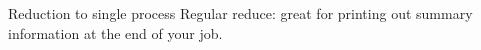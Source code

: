 \begin{comment}
\begin{numberedframe}{Inner product calculation}
  Given vectors $x,y$:
  \[ x^ty = \sum_{i=0}^{N-1} x_iy_i \]
  Start out with distributed vectors~$x,y$,\\
  assume same distribution.

  Proposed solution:\\
  \indexmpishow{MPI_Gather} or \indexmpishow{MPI_Allgather}
  and calculate locally.

  Comments?
\end{numberedframe}

\begin{numberedframe}{Inner product calculation another way}
  What are (at least two) problems with:
\begin{lstlisting}
double local_prod[localsize],global_inprod[localsize];
for (i=0; i<localsize; i++)
    local_prod[i] = x[i]*y[i];
MPI_Allreduce( &local_prod, &global_inprod, 
               localsize,MPI_DOUBLE,MPI_SUM,comm )
\end{lstlisting}
\end{numberedframe}

\begin{numberedframe}{Inner product calculation: the right way}
  Compute local part, then collect local sums.

\lstset{language=C}
\begin{lstlisting}
local_inprod = 0;
for (i=0; i<localsize; i++)
  local_inprod += x[i]*y[i];
MPI_Allreduce( &local_inprod, &global_inprod, 
               1,MPI_DOUBLE,MPI_SUM,comm )
\end{lstlisting}
\end{numberedframe}
\end{comment}

\begin{comment}
  \begin{optexerciseframe}
    
  \end{optexerciseframe}
\end{comment}

\begin{numberedframe}{Reduction to single process}
    Regular reduce: great for printing out summary information at the
  end of your job.
\end{numberedframe}

